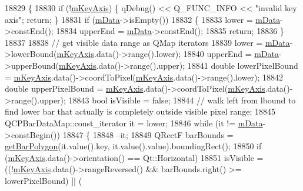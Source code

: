 \begin{DoxyCode}
18829 \{
18830   \textcolor{keywordflow}{if} (!\hyperlink{class_q_c_p_abstract_plottable_a426f42e254d0f8ce5436a868c61a6827}{mKeyAxis}) \{ qDebug() << Q\_FUNC\_INFO << \textcolor{stringliteral}{"invalid key axis"}; \textcolor{keywordflow}{return}; \}
18831   \textcolor{keywordflow}{if} (\hyperlink{class_q_c_p_bars_aef28d29d51ef84b608ecd22c55d531ff}{mData}->isEmpty())
18832   \{
18833     lower = \hyperlink{class_q_c_p_bars_aef28d29d51ef84b608ecd22c55d531ff}{mData}->constEnd();
18834     upperEnd = \hyperlink{class_q_c_p_bars_aef28d29d51ef84b608ecd22c55d531ff}{mData}->constEnd();
18835     \textcolor{keywordflow}{return};
18836   \}
18837   
18838   \textcolor{comment}{// get visible data range as QMap iterators}
18839   lower = \hyperlink{class_q_c_p_bars_aef28d29d51ef84b608ecd22c55d531ff}{mData}->lowerBound(\hyperlink{class_q_c_p_abstract_plottable_a426f42e254d0f8ce5436a868c61a6827}{mKeyAxis}.data()->range().lower);
18840   upperEnd = \hyperlink{class_q_c_p_bars_aef28d29d51ef84b608ecd22c55d531ff}{mData}->upperBound(\hyperlink{class_q_c_p_abstract_plottable_a426f42e254d0f8ce5436a868c61a6827}{mKeyAxis}.data()->range().upper);
18841   \textcolor{keywordtype}{double} lowerPixelBound = \hyperlink{class_q_c_p_abstract_plottable_a426f42e254d0f8ce5436a868c61a6827}{mKeyAxis}.data()->coordToPixel(\hyperlink{class_q_c_p_abstract_plottable_a426f42e254d0f8ce5436a868c61a6827}{mKeyAxis}.data()->range().lower);
18842   \textcolor{keywordtype}{double} upperPixelBound = \hyperlink{class_q_c_p_abstract_plottable_a426f42e254d0f8ce5436a868c61a6827}{mKeyAxis}.data()->coordToPixel(\hyperlink{class_q_c_p_abstract_plottable_a426f42e254d0f8ce5436a868c61a6827}{mKeyAxis}.data()->range().upper);
18843   \textcolor{keywordtype}{bool} isVisible = \textcolor{keyword}{false};
18844   \textcolor{comment}{// walk left from lbound to find lower bar that actually is completely outside visible pixel range:}
18845   QCPBarDataMap::const\_iterator it = lower;
18846   \textcolor{keywordflow}{while} (it != \hyperlink{class_q_c_p_bars_aef28d29d51ef84b608ecd22c55d531ff}{mData}->constBegin())
18847   \{
18848     --it;
18849     QRectF barBounds = \hyperlink{class_q_c_p_bars_a1d118a76662cfd691a78c6f573e3f78c}{getBarPolygon}(it.value().key, it.value().value).boundingRect();
18850     \textcolor{keywordflow}{if} (\hyperlink{class_q_c_p_abstract_plottable_a426f42e254d0f8ce5436a868c61a6827}{mKeyAxis}.data()->orientation() == Qt::Horizontal)
18851       isVisible = ((!\hyperlink{class_q_c_p_abstract_plottable_a426f42e254d0f8ce5436a868c61a6827}{mKeyAxis}.data()->rangeReversed() && barBounds.right() >= lowerPixelBound) || (

\end{DoxyCode}
